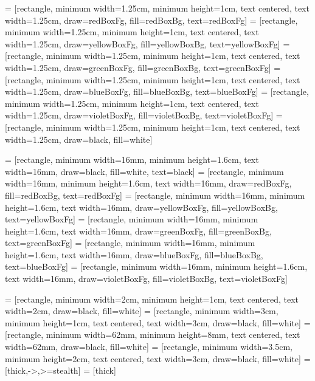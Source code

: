 


 = [rectangle, minimum width=1.25cm, minimum height=1cm, text centered, text width=1.25cm, draw=redBoxFg, fill=redBoxBg, text=redBoxFg]
 = [rectangle, minimum width=1.25cm, minimum height=1cm, text centered, text width=1.25cm, draw=yellowBoxFg, fill=yellowBoxBg, text=yellowBoxFg]
 = [rectangle, minimum width=1.25cm, minimum height=1cm, text centered, text width=1.25cm, draw=greenBoxFg, fill=greenBoxBg, text=greenBoxFg]
 = [rectangle, minimum width=1.25cm, minimum height=1cm, text centered, text width=1.25cm, draw=blueBoxFg, fill=blueBoxBg, text=blueBoxFg]
 = [rectangle, minimum width=1.25cm, minimum height=1cm, text centered, text width=1.25cm, draw=violetBoxFg, fill=violetBoxBg, text=violetBoxFg]
 = [rectangle, minimum width=1.25cm, minimum height=1cm, text centered, text width=1.25cm, draw=black, fill=white]

 = [rectangle, minimum width=16mm, minimum height=1.6cm, text width=16mm, draw=black, fill=white, text=black]
 = [rectangle, minimum width=16mm, minimum height=1.6cm, text width=16mm, draw=redBoxFg, fill=redBoxBg, text=redBoxFg]
 = [rectangle, minimum width=16mm, minimum height=1.6cm, text width=16mm, draw=yellowBoxFg, fill=yellowBoxBg, text=yellowBoxFg]
 = [rectangle, minimum width=16mm, minimum height=1.6cm, text width=16mm, draw=greenBoxFg, fill=greenBoxBg, text=greenBoxFg]
 = [rectangle, minimum width=16mm, minimum height=1.6cm, text width=16mm, draw=blueBoxFg, fill=blueBoxBg, text=blueBoxFg]
 = [rectangle, minimum width=16mm, minimum height=1.6cm, text width=16mm, draw=violetBoxFg, fill=violetBoxBg, text=violetBoxFg]

 = [rectangle, minimum width=2cm, minimum height=1cm, text centered, text width=2cm, draw=black, fill=white]
 = [rectangle, minimum width=3cm, minimum height=1cm, text centered, text width=3cm, draw=black, fill=white]
 = [rectangle, minimum width=62mm, minimum height=8mm, text centered, text width=62mm, draw=black, fill=white]
 = [rectangle, minimum width=3.5cm, minimum height=2cm, text centered, text width=3cm, draw=black, fill=white]
 = [thick,->,>=stealth]
 = [thick]



